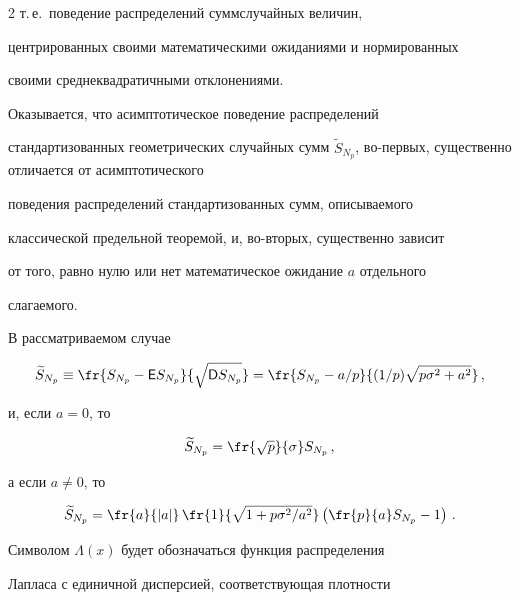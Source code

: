\begin{multicols}{2}
т.\,е.\ поведение распределений сумм\linebreak случайных величин,


центрированных своими математическими ожиданиями и нормированных


своими среднеквадратичными отклонениями.





Оказывается, что асимптотическое поведение распределений


стандартизованных геометрических случайных сумм $\widetilde


S_{N_p}$, во-первых, существенно отличается от асимптотического


поведения распределений стандартизованных сумм, описываемого


классической предельной теоремой, и, во-вторых, существенно зависит


от того, равно нулю или нет математическое ожидание $a$ отдельного


слагаемого.





В рассматриваемом случае


$$


\widetilde S_{N_p}\equiv\fr{S_{N_p}-{\sf E}S_{N_p}}{\sqrt{{\sf


D}S_{N_p}}}=\fr{S_{N_p}-a/p}{(1/p)\sqrt{p\sigma^2+a^2}}\,,


$$


и, если $a=0$, то


$$


\widetilde S_{N_p}=\fr{\sqrt{p}}{\sigma}S_{N_p}\,,


$$


а если $a\neq0$, то


\begin{equation}


\widetilde S_{N_p}=


\fr{a}{|a|}\,\fr{1}{\sqrt{1+p\sigma^2/a^2}}\left(


\fr{p}{a}S_{N_p}-1\right)\,.


\label{4.2b}


\end{equation}





Символом $\Lambda(x)$ будет обозначаться функция распределения


Лапласа с единичной дисперсией, соответствующая плотности



\end{multicols}

